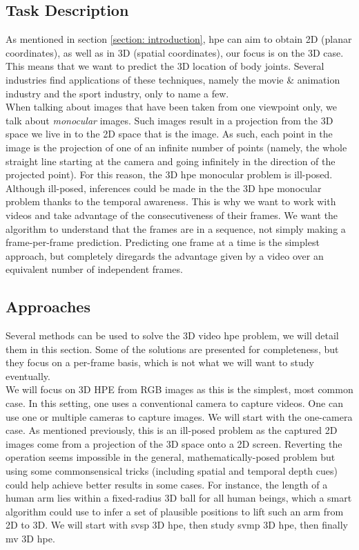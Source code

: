 \documentclass[runningheads]{llncs}
\begin{document}
\subsection{Task Description}
As mentioned in section \ref{section: introduction}, \ac{hpe} can aim to obtain 2D (planar coordinates), as well as in 3D (spatial coordinates), our focus is on the 3D case. This means that we want to predict the 3D location of body joints. Several industries find applications of these techniques, namely the movie \& animation industry and the sport industry, only to name a few. \\
When talking about images that have been taken from one viewpoint only, we talk about \textit{monocular} images. Such images result in a projection from the 3D space we live in to the 2D space that is the image. As such, each point in the image is the projection of one of an infinite number of points (namely, the whole straight line starting at the camera and going infinitely in the direction of the projected point). For this reason, the 3D \ac{hpe} monocular problem is ill-posed. \\
Although ill-posed, inferences could be made in the the 3D \ac{hpe} monocular problem thanks to the temporal awareness. This is why we want to work with videos and take advantage of the consecutiveness of their frames. We want the algorithm to understand that the frames are in a sequence, not simply making a frame-per-frame prediction. Predicting one frame at a time is the simplest approach, but completely diregards the advantage given by a video over an equivalent number of independent frames.

\subsection{Approaches}
Several methods can be used to solve the 3D video \ac{hpe} problem, we will detail them in this section. Some of the solutions are presented for completeness, but they focus on a per-frame basis, which is not what we will want to study eventually. \\
We will focus on 3D HPE from RGB images as this is the simplest, most common case. In this setting, one uses a conventional camera to capture videos. One can use one or multiple cameras to capture images. We will start with the one-camera case. As mentioned previously, this is an ill-posed problem as the captured 2D images come from a projection of the 3D space onto a 2D screen. Reverting the operation seems impossible in the general, mathematically-posed problem but using some commonsensical tricks (including spatial and temporal depth cues) could help achieve better results in some cases. For instance, the length of a human arm lies within a fixed-radius 3D ball for all human beings, which a smart algorithm could use to infer a set of plausible positions to lift such an arm from 2D to 3D. We will start with \ac{svsp} 3D \ac{hpe}, then study \ac{svmp} 3D \ac{hpe}, then finally \ac{mv} 3D \ac{hpe}.
\end{document}
